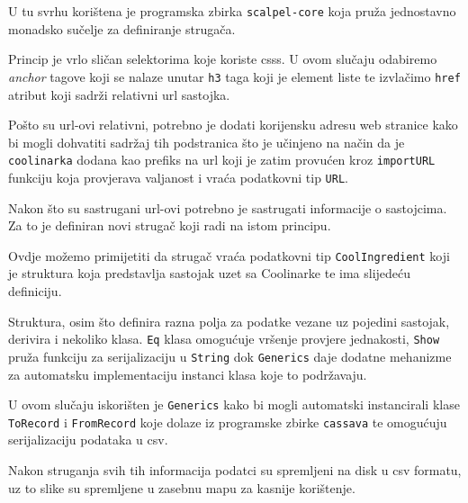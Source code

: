 U tu svrhu korištena je programska zbirka \texttt{scalpel-core} koja pruža jednostavno monadsko sučelje za definiranje strugača.


Princip je vrlo sličan selektorima koje koriste \acp{css}. U ovom slučaju odabiremo \textit{anchor} tagove koji se nalaze unutar \texttt{h3} taga koji je element liste te izvlačimo \texttt{href} atribut koji sadrži relativni \ac{url} sastojka.

Pošto su \ac{url}-ovi relativni, potrebno je dodati korijensku adresu web stranice kako bi mogli dohvatiti sadržaj tih podstranica što je učinjeno na način da je \texttt{coolinarka} dodana kao prefiks na \ac{url} koji je zatim provućen kroz \texttt{importURL} funkciju koja provjerava valjanost i vraća podatkovni tip \texttt{URL}.

Nakon što su sastrugani \ac{url}-ovi potrebno je sastrugati informacije o sastojcima. Za to je definiran novi strugač koji radi na istom principu.


Ovdje možemo primijetiti da strugač vraća podatkovni tip \texttt{CoolIngredient} koji je struktura koja predstavlja sastojak uzet sa Coolinarke te ima slijedeću definiciju.


Struktura, osim što definira razna polja za podatke vezane uz pojedini sastojak, derivira i nekoliko klasa. \texttt{Eq} klasa omogućuje vršenje provjere jednakosti, \texttt{Show} pruža funkciju za serijalizaciju u \texttt{String} dok \texttt{Generics} daje dodatne mehanizme za automatsku implementaciju instanci klasa koje to podržavaju.

U ovom slučaju iskorišten je \texttt{Generics} kako bi mogli automatski instancirali klase \texttt{ToRecord} i \texttt{FromRecord} koje dolaze iz programske zbirke \texttt{cassava} te omogućuju serijalizaciju podataka u \ac{csv}.

Nakon struganja svih tih informacija podatci su spremljeni na disk u \ac{csv} formatu, uz to slike su spremljene u zasebnu mapu za kasnije korištenje.

